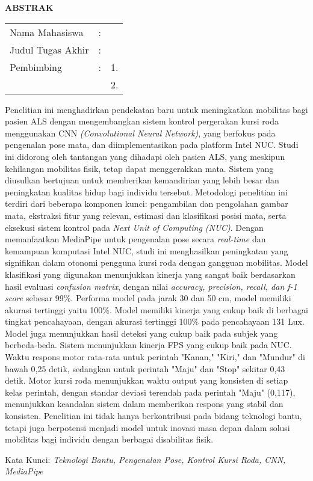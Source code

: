 \begin{center}
  \large\textbf{ABSTRAK}
\end{center}


\vspace{2ex}

\begingroup
\setlength{\tabcolsep}{0pt}

\noindent
\begin{tabularx}{\textwidth}{l >{\centering}m{2em} X}
  Nama Mahasiswa    & : & \name{}         \\

  Judul Tugas Akhir & : & \tatitle{}      \\

  Pembimbing        & : & 1. \advisor{}   \\
                    &   & 2. \coadvisor{} \\
\end{tabularx}
\endgroup

Penelitian ini menghadirkan pendekatan baru untuk meningkatkan mobilitas bagi pasien ALS dengan mengembangkan sistem kontrol pergerakan kursi roda menggunakan CNN \emph{(Convolutional Neural Network)}, yang berfokus pada pengenalan pose mata, dan diimplementasikan pada platform Intel NUC. Studi ini didorong oleh tantangan yang dihadapi oleh pasien ALS, yang meskipun kehilangan mobilitas fisik, tetap dapat menggerakkan mata. Sistem yang diusulkan bertujuan untuk memberikan kemandirian yang lebih besar dan peningkatan kualitas hidup bagi individu tersebut. Metodologi penelitian ini terdiri dari beberapa komponen kunci: pengambilan dan pengolahan gambar mata, ekstraksi fitur yang relevan, estimasi dan klasifikasi posisi mata, serta eksekusi sistem kontrol pada \textit{Next Unit of Computing (NUC)}. Dengan memanfaatkan MediaPipe untuk pengenalan pose secara \emph{real-time} dan kemampuan komputasi Intel NUC, studi ini menghasilkan peningkatan yang signifikan dalam otonomi pengguna kursi roda dengan gangguan mobilitas.  Model klasifikasi yang digunakan menunjukkan kinerja yang sangat baik berdasarkan hasil evaluasi \emph{confusion matrix}, dengan nilai \emph{accuracy, precision, recall, dan f-1 score} sebesar 99\%. Performa model pada jarak 30 dan 50 cm, model memiliki akurasi tertinggi yaitu 100\%. Model memiliki kinerja yang cukup baik di berbagai tingkat pencahayaan, dengan akurasi tertinggi 100\% pada pencahayaan 131 Lux. Model juga menunjukkan hasil deteksi yang cukup baik pada subjek yang berbeda-beda. Sistem menunjukkan kinerja FPS yang cukup baik pada NUC. Waktu respons motor rata-rata untuk perintah "Kanan," "Kiri," dan "Mundur" di bawah 0,25 detik, sedangkan untuk perintah "Maju" dan "Stop" sekitar 0,43 detik. Motor kursi roda menunjukkan waktu output yang konsisten di setiap kelas perintah, dengan standar deviasi terendah pada perintah "Maju" (0,117), menunjukkan keandalan sistem dalam memberikan respons yang stabil dan konsisten. Penelitian ini tidak hanya berkontribusi pada bidang teknologi bantu, tetapi juga berpotensi menjadi model untuk inovasi masa depan dalam solusi mobilitas bagi individu dengan berbagai disabilitas fisik.

Kata Kunci: \emph{Teknologi Bantu, Pengenalan Pose, Kontrol Kursi Roda, CNN, MediaPipe}
